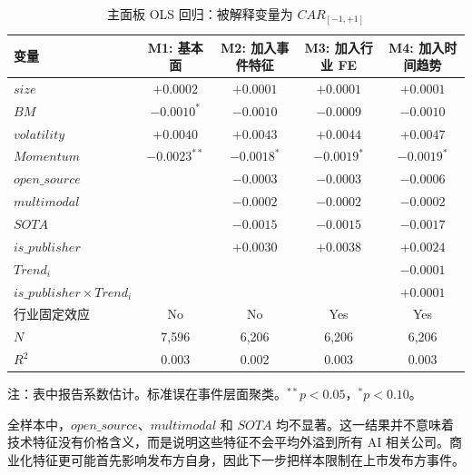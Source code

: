 \documentclass[11pt,fontset=fandol]{ctexart}
\begin{document}
\begin{table}[htbp]
\centering
\caption{主面板 OLS 回归：被解释变量为 $CAR_{[-1,+1]}$}
\label{tab:main_ols}
\small
\begin{threeparttable}
\begin{tabular}{lcccc}
\toprule
变量 & M1: 基本面 & M2: 加入事件特征 & M3: 加入行业 FE & M4: 加入时间趋势 \\
\midrule
$size$              & $+0.0002$          & $+0.0001$       & $+0.0001$       & $+0.0001$ \\
$BM$                & $-0.0010^{*}$      & $-0.0010$       & $-0.0009$       & $-0.0010$ \\
$volatility$        & $+0.0040$          & $+0.0043$       & $+0.0044$       & $+0.0047$ \\
$Momentum$          & $-0.0023^{**}$     & $-0.0018^{*}$   & $-0.0019^{*}$   & $-0.0019^{*}$ \\
$open\_source$      &                    & $-0.0003$       & $-0.0003$       & $-0.0006$ \\
$multimodal$        &                    & $-0.0002$       & $-0.0002$       & $-0.0002$ \\
$SOTA$              &                    & $-0.0015$       & $-0.0015$       & $-0.0017$ \\
$is\_publisher$     &                    & $+0.0030$       & $+0.0038$       & $+0.0024$ \\
$Trend_i$           &                    &                 &                 & $-0.0001$ \\
$is\_publisher\times Trend_i$ &          &                 &                 & $+0.0001$ \\
\midrule
行业固定效应 & No & No & Yes & Yes \\
$N$            & 7{,}596 & 6{,}206 & 6{,}206 & 6{,}206 \\
$R^2$          & 0.003 & 0.002 & 0.003 & 0.003 \\
\bottomrule
\end{tabular}
\begin{tablenotes}\footnotesize
\item 注：表中报告系数估计。标准误在事件层面聚类。$^{**}p<0.05$，$^{*}p<0.10$。
\end{tablenotes}
\end{threeparttable}
\end{table}

全样本中，$open\_source$、$multimodal$ 和 $SOTA$ 均不显著。这一结果并不意味着技术特征没有价格含义，而是说明这些特征不会平均外溢到所有 AI 相关公司。商业化特征更可能首先影响发布方自身，因此下一步把样本限制在上市发布方事件。
\end{document}
